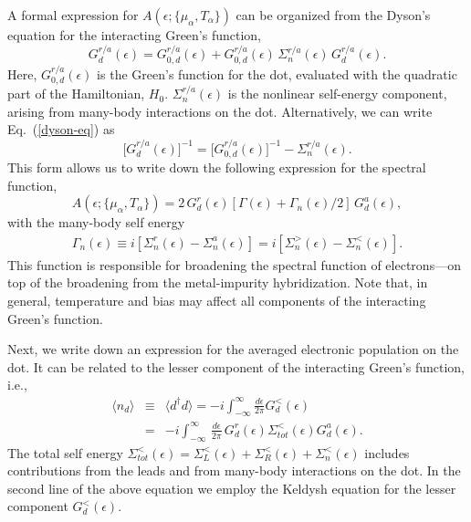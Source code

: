 \documentclass[aps,pra,twocolumn,groupedaddress,showpacs,superscriptaddress,amssymb,amsmath]{revtex4-1}
\newcommand{\be}{\begin{equation}}
\newcommand{\ee}{\end{equation}}
\newcommand{\bea}{\begin{eqnarray}}
\newcommand{\eea}{\end{eqnarray}}
\begin{document}
A formal expression for $A(\epsilon; \{\mu_{\alpha},T_{\alpha}\})$ can be organized from the Dyson's equation 
\cite{bijay-wang-review, Haug-book, Rammer_review, Rammer_book} 
for the  interacting Green's function,
%
\be
G_d^{r/a}(\epsilon) = G_{0,d}^{r/a}(\epsilon) + G_{0,d}^{r/a}(\epsilon)\, \Sigma_n^{r/a}(\epsilon)\,G_d^{r/a}(\epsilon).
\label{dyson-eq}
\ee
%
Here, $G_{0,d}^{r/a}(\epsilon)$ is the Green's function for the dot, evaluated with the 
quadratic part of the Hamiltonian, $H_0$.
$\Sigma_n^{r/a}(\epsilon)$ is the nonlinear self-energy component, 
arising from many-body interactions on the dot.
Alternatively, we can write Eq.~(\ref{dyson-eq}) as 
%
\be
\Big[G_d^{r/a}(\epsilon)\Big]^{-1} = \Big[G_{0,d}^{r/a}(\epsilon)\Big]^{-1} - \Sigma_n^{r/a}(\epsilon).
\ee
%
This form allows us to write down the following expression for the spectral function,
%
\be
 A(\epsilon; \{\mu_{\alpha},T_{\alpha}\}) = 2 \, G_d^r(\epsilon) 
\left[ \Gamma(\epsilon) + \Gamma_n(\epsilon) /2 \right] \, G_d^a(\epsilon),
\label{eq:spectral}
\ee
%
with the many-body self energy
%
\bea
\Gamma_n(\epsilon) \equiv i \left[\Sigma_n^r(\epsilon) -\Sigma_n^a(\epsilon)\right]= 
i \left[\Sigma_n^>(\epsilon) -\Sigma_n^<(\epsilon)\right].
\eea
%
This function is responsible for broadening the spectral function of electrons---on top of the 
broadening from the metal-impurity hybridization.
Note that, in general, temperature and bias may affect all components  of the interacting Green's function.

Next, we write down an expression for the averaged electronic population on the dot. 
It can be related to the lesser component of the interacting Green's function, i.e.,
%
\bea
\langle n_d \rangle &\equiv& \langle d^{\dagger} d \rangle = -i \int_{-\infty}^{\infty} \frac{d\epsilon}{2 \pi} G_d^<(\epsilon) \nonumber \\
&=&-i \int_{-\infty}^{\infty}  \,\frac{d\epsilon}{2 \pi} \, G_d^r(\epsilon) \Sigma_{tot}^{<}(\epsilon) G_d^a(\epsilon).
\label{eq:navg}
\eea
%
The total self energy
$\Sigma_{tot}^{<}(\epsilon)= \Sigma_L^{<}(\epsilon)+ \Sigma_R^{<}(\epsilon)+\Sigma_n^{<}(\epsilon)$ 
includes contributions from the leads and from many-body interactions on the dot.
In the second line of the above equation we employ the Keldysh equation 
\cite{Kadanoff, Keldysh, book1,bijay-wang-review} for the lesser component $G_d^{<}(\epsilon)$.
\end{document}
